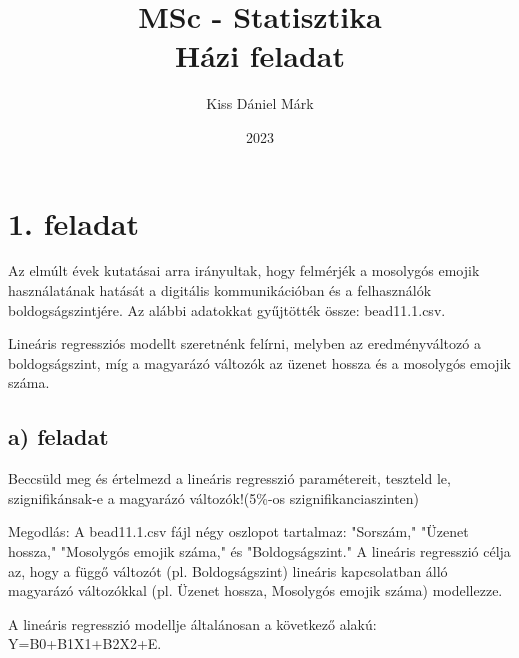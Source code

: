 \documentclass[11pt,a4paper,oneside]{report}
\title{\Huge{MSc - Statisztika}\\Házi feladat}
\author{\huge{Kiss Dániel Márk}}
\date{2023}
\begin{document}
\maketitle
\newpage
\pagebreak

\chapter{1. feladat}

Az elmúlt évek kutatásai arra irányultak, hogy felmérjék a mosolygós emojik használatának hatását a digitális kommunikációban
és a felhasználók boldogságszintjére. Az alábbi adatokkat gyűjtötték össze: bead11.1.csv.

Lineáris regressziós modellt szeretnénk felírni, melyben az eredményváltozó a boldogságszint, míg a magyarázó változók az üzenet hossza és
a mosolygós emojik száma.
\section{a) feladat}
Beccsüld meg és értelmezd a lineáris regresszió paramétereit, teszteld le, szignifikánsak-e a magyarázó változók!(5\%-os szignifikanciaszinten)

Megodlás:
A bead11.1.csv fájl négy oszlopot tartalmaz: "Sorszám," "Üzenet hossza," "Mosolygós emojik száma," és "Boldogságszint."
A lineáris regresszió célja az, hogy a függő változót (pl. Boldogságszint) lineáris kapcsolatban álló magyarázó változókkal (pl. Üzenet hossza, Mosolygós emojik száma) modellezze.

A lineáris regresszió modellje általánosan a következő alakú:
Y=B0+B1X1+B2X2+E.
\end{document}
